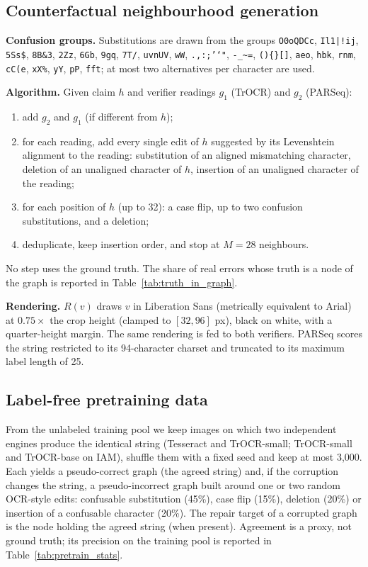 \subsection{Counterfactual neighbourhood generation}
\label{app:graph}
\textbf{Confusion groups.} Substitutions are drawn from the groups
\texttt{O0oQDCc}, \texttt{Il1|!ij}, \texttt{5Ss\$}, \texttt{8B\&3}, \texttt{2Zz}, \texttt{6Gb}, \texttt{9gq},
\texttt{7T/}, \texttt{uvnUV}, \texttt{wW}, \texttt{.,:;'`"}, \texttt{-\_\textasciitilde=}, \texttt{()\{\}[]},
\texttt{aeo}, \texttt{hbk}, \texttt{rnm}, \texttt{cC(e}, \texttt{xX\%}, \texttt{yY}, \texttt{pP}, \texttt{fft}; at most two
alternatives per character are used.

\textbf{Algorithm.} Given claim $h$ and verifier readings $g_1$ (TrOCR) and $g_2$ (PARSeq):
\begin{enumerate}
\item add $g_2$ and $g_1$ (if different from $h$);
\item for each reading, add every single edit of $h$ suggested by its Levenshtein alignment to the
reading: substitution of an aligned mismatching character, deletion of an unaligned character of $h$,
insertion of an unaligned character of the reading;
\item for each position of $h$ (up to 32): a case flip, up to two confusion substitutions, and a deletion;
\item deduplicate, keep insertion order, and stop at $M=28$ neighbours.
\end{enumerate}
No step uses the ground truth. The share of real errors whose truth is a node of the graph is reported
in Table~\ref{tab:truth_in_graph}.

\textbf{Rendering.} $R(v)$ draws $v$ in Liberation Sans (metrically equivalent to Arial) at
$0.75\times$ the crop height (clamped to $[32,96]$ px), black on white, with a quarter-height margin. The
same rendering is fed to both verifiers. PARSeq scores the string restricted to its 94-character
charset and truncated to its maximum label length of 25.


\subsection{Label-free pretraining data}
\label{app:pretrain}
From the unlabeled training pool we keep images on which two independent engines produce the
identical string (Tesseract and TrOCR-small; TrOCR-small and TrOCR-base on IAM), shuffle them with a
fixed seed and keep at most 3{,}000. Each yields a pseudo-correct graph (the agreed string) and, if the
corruption changes the string, a pseudo-incorrect graph built around one or two random OCR-style edits:
confusable substitution (45\%), case flip (15\%), deletion (20\%) or insertion of a confusable character
(20\%). The repair target of a corrupted graph is the node holding the agreed string (when present).
Agreement is a proxy, not ground truth; its precision on the training pool is reported in
Table~\ref{tab:pretrain_stats}.

